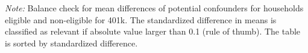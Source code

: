 \documentclass[12pt,a4paper]{article}
\begin{document}
\begin{singlespace}
			\def\sym#1{\ifmmode^{#1}\else\(^{#1}\)\fi}
			\begin{ThreePartTable}
				\begin{TableNotes}
					\begin{scriptsize}
					\item \textit{Note:} Balance check for mean differences of potential confounders for households eligible and non-eligible for 401k. The standardized difference in means is classified as relevant if absolute value larger than 0.1 (rule of thumb). The table is sorted by standardized difference.
					\end{scriptsize}
				\end{TableNotes}
				

\end{ThreePartTable}
\end{singlespace}
\end{document}
